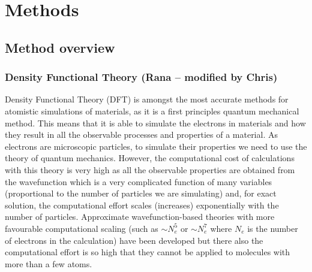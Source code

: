 \documentclass[../main.tex]{subfiles}
\begin{document}
\section{Methods}
\subsection{Method overview}
\label{sec:methods}
    

\subsubsection{Density Functional Theory (Rana  -- modified by Chris)}
\label{sec:dft}
Density Functional Theory (DFT) is amongst the most accurate methods for atomistic simulations of materials, as it is a first principles quantum mechanical method. This means that it is able to simulate the electrons in materials and how they result in all the observable processes and properties of a  material. As electrons are microscopic particles, to simulate their properties we need to use the theory of quantum mechanics. However, the computational cost of calculations with this theory is very high as all the observable properties are obtained from the wavefunction which is a very complicated function of many variables (proportional to the number of particles we are simulating) and, for exact solution, the computational effort scales (increases) exponentially with the number of particles. Approximate wavefunction-based theories with more favourable computational scaling (such as $\sim N_e^5$ or $\sim N_e^7$ where $N_e$ is the number of electrons in the calculation) have been developed but there also the computational effort is so high that they cannot be applied to molecules with more than a few atoms. 
\end{document}
